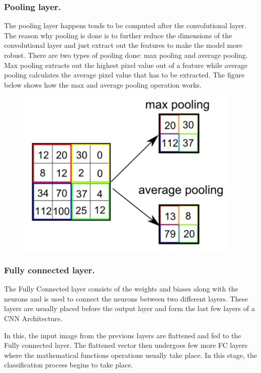 \documentclass[11pt]{report}
\begin{document}
\subsubsection*{Pooling layer.}
The pooling layer happens tends to be computed after the convolutional layer. The reason why pooling is
done is to further reduce the dimensions of the convolutional layer and just extract out the features to make
the model more robust. There are two types of pooling done: max pooling and average pooling. Max pooling
extracts out the highest pixel value out of a feature while average pooling calculates the average pixel value
that has to be extracted. The figure below shows how the max and average pooling operation works.\\

\begin{figure}[h]
	\centerline{\small 
		\includegraphics[height=0.25\textheight]  {f2}}
\end{figure}



\subsubsection*{Fully connected layer.}
The Fully Connected layer consists of the weights and biases along with the neurons and is used to connect the neurons between two different layers. These layers are usually placed before the output layer and form the last few layers of a CNN Architecture.

In this, the input image from the previous layers are flattened and fed to the Fully connected layer. The flattened vector then undergoes few more FC layers where the mathematical functions operations usually take place. In this stage, the classification process begins to take place.\\
\end{document}
